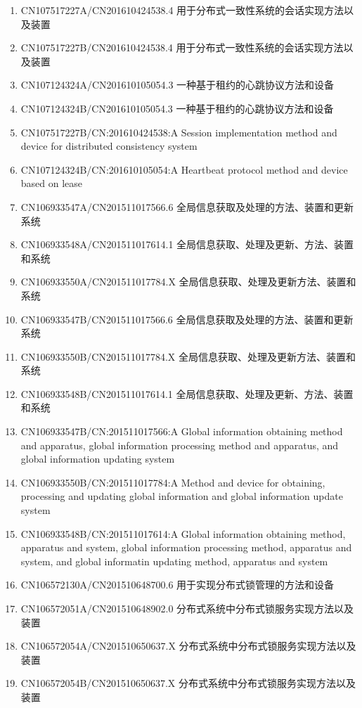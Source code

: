 \documentclass[scheme=plain]{ctexart}
\begin{document}
\begin{enumerate}
    \item CN107517227A/CN201610424538.4 用于分布式一致性系统的会话实现方法以及装置
    \item CN107517227B/CN201610424538.4 用于分布式一致性系统的会话实现方法以及装置
    \item CN107124324A/CN201610105054.3 一种基于租约的心跳协议方法和设备
    \item CN107124324B/CN201610105054.3 一种基于租约的心跳协议方法和设备
    \item CN107517227B/CN:201610424538:A Session implementation method and device for distributed consistency system
    \item CN107124324B/CN:201610105054:A Heartbeat protocol method and device based on lease
    \item CN106933547A/CN201511017566.6 全局信息获取及处理的方法、装置和更新系统
    \item CN106933548A/CN201511017614.1 全局信息获取、处理及更新、方法、装置和系统
    \item CN106933550A/CN201511017784.X 全局信息获取、处理及更新方法、装置和系统
    \item CN106933547B/CN201511017566.6 全局信息获取及处理的方法、装置和更新系统
    \item CN106933550B/CN201511017784.X 全局信息获取、处理及更新方法、装置和系统
    \item CN106933548B/CN201511017614.1 全局信息获取、处理及更新、方法、装置和系统
    \item CN106933547B/CN:201511017566:A Global information obtaining method and apparatus, global information processing method and apparatus, and global information updating system
    \item CN106933550B/CN:201511017784:A Method and device for obtaining, processing and updating global information and global information update system
    \item CN106933548B/CN:201511017614:A Global information obtaining method, apparatus and system, global information processing method, apparatus and system, and global informatin updating method, apparatus and system
    \item CN106572130A/CN201510648700.6 用于实现分布式锁管理的方法和设备
    \item CN106572051A/CN201510648902.0 分布式系统中分布式锁服务实现方法以及装置
    \item CN106572054A/CN201510650637.X 分布式系统中分布式锁服务实现方法以及装置
    \item CN106572054B/CN201510650637.X 分布式系统中分布式锁服务实现方法以及装置

\end{enumerate}
\end{document}
